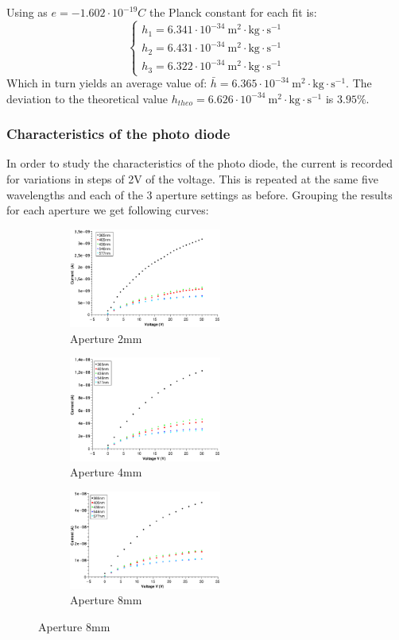 \documentclass{scrartcl}
\begin{document}
\noindent Using as $e=-1.602\cdot 10^{-19}C$ the Planck constant for each fit is: \[\begin{cases}
    h_1 = 6.341 \cdot 10^{-34} \ \text{m}^2 \cdot \text{kg} \cdot \text{s}^{-1} \\
    h_2 = 6.431 \cdot 10^{-34} \ \text{m}^2 \cdot \text{kg}\cdot \text{s}^{-1} \\
    h_3 = 6.322 \cdot 10^{-34} \ \text{m}^2 \cdot \text{kg}\cdot \text{s}^{-1}
\end{cases}\]
Which in turn yields an average value of: $\bar{h} = 6.365 \cdot 10^{-34} \ \text{m}^2 \cdot \text{kg}\cdot \text{s}^{-1}$. The deviation to the theoretical value $h_{theo} = 6.626 \cdot 10^{-34} \ \text{m}^2 \cdot \text{kg}\cdot \text{s}^{-1}$ is $3.95\%$.

\subsubsection{Characteristics of the photo diode}
In order to study the characteristics of the photo diode, the current is recorded for variations in steps of 2V of the voltage. This is repeated at the same five wavelengths and each of the 3 aperture settings as before. Grouping the results for each aperture we get following curves:

\begin{figure}[ht]
\begin{subfigure}{0.3 \textwidth}
    \includegraphics[width=5cm]{TP1_PhotoEffect_Part2_Aperture2mm.eps}
    \caption{Aperture 2mm}
\end{subfigure}
\begin{subfigure}{0.3 \textwidth}
    \includegraphics[width=5cm]{TP1_PhotoEffect_Part2_Aperture4mm.eps}
    \caption{Aperture 4mm}
\end{subfigure}
\begin{subfigure}{0.3 \textwidth}
    \includegraphics[width=5cm]{TP1_PhotoEffect_Part2_Aperture8mm.eps}
    \caption{Aperture 8mm}
\end{subfigure}
\end{figure}
\FloatBarrier 
\end{document}
